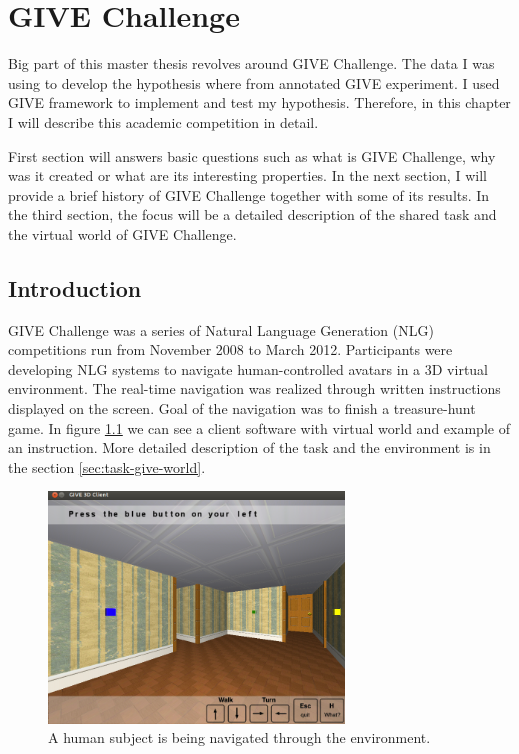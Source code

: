 \chapter{GIVE Challenge}
\label{chap:give-challenge}
Big part of this master thesis revolves around GIVE Challenge. The data I was using to develop the hypothesis where from annotated GIVE experiment. I used GIVE framework to implement and test my hypothesis. Therefore, in this chapter I will describe this academic competition in detail.  

First section will answers basic questions such as what is GIVE Challenge, why was it created or what are its interesting properties. In the next section, I will provide a brief history of GIVE Challenge together with some of its results. In the third section, the focus will be a detailed description of the shared task and the virtual world of GIVE Challenge.

\section{Introduction}
GIVE Challenge was a series of Natural Language Generation (NLG) competitions run from November 2008 to March 2012. Participants were developing NLG systems to navigate human-controlled avatars in a 3D virtual environment. The real-time navigation was realized through written instructions displayed on the screen. Goal of the navigation was to finish a treasure-hunt game. In figure \ref{fig:give-client} we can see a client software with virtual world and example of an instruction. More detailed description of the task and the environment is in the section \ref{sec:task-give-world}.

\begin{figure}[h]
  \centering
	\includegraphics[width=0.7\textwidth]{Images/give-client}
	\caption{A human subject is being navigated through the environment.}
	\label{fig:give-client}
\end{figure}

